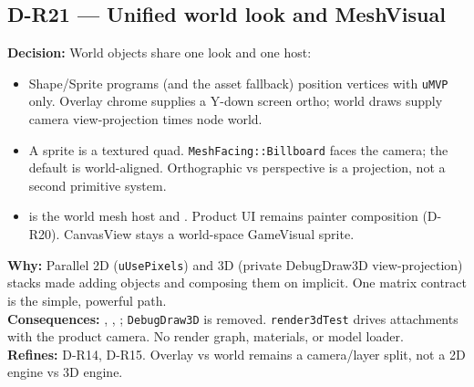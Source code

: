 \subsection*{D-R21 --- Unified world look and MeshVisual}
\begin{decisionbox}[title={D-R21 \quad 2026-08-29}]
\textbf{Decision:} World objects share one look and one host:
\begin{itemize}
  \item Shape/Sprite programs (and the asset fallback) position vertices with
        \texttt{uMVP} only. Overlay chrome supplies a Y-down screen ortho;
        world draws supply camera view-projection times node world.
  \item A sprite is a textured quad. \texttt{MeshFacing::Billboard} faces the
        camera; the default is world-aligned. Orthographic vs perspective is a
         projection, not a second primitive system.
  \item {} is the world mesh host and
        . Product UI remains
         painter composition (D-R20). CanvasView stays a
        world-space GameVisual sprite.
\end{itemize}
\textbf{Why:} Parallel 2D (\texttt{uUsePixels}) and 3D (private DebugDraw3D
view-projection) stacks made adding objects and composing them on
 implicit. One matrix contract is the simple, powerful
path.\\
\textbf{Consequences:} , ,
; \texttt{DebugDraw3D} is removed.
\texttt{render3dTest} drives  attachments with the product
camera. No render graph, materials, or model loader.\\
\textbf{Refines:} D-R14, D-R15. Overlay vs world remains a camera/layer split,
not a 2D engine vs 3D engine.
\end{decisionbox}


